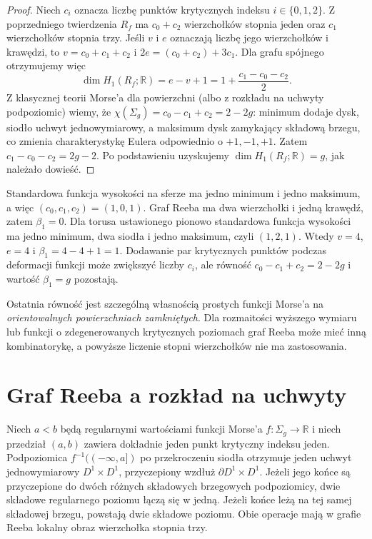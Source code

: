 \begin{proof}
Niech $c_i$ oznacza liczbę punktów krytycznych indeksu
$i\in\{0,1,2\}$. Z poprzedniego twierdzenia $R_f$ ma
$c_0+c_2$ wierzchołków stopnia jeden oraz $c_1$
wierzchołków stopnia trzy. Jeśli $v$ i $e$ oznaczają
liczbę jego wierzchołków i krawędzi, to
$v=c_0+c_1+c_2$ i
$2e=(c_0+c_2)+3c_1$.
Dla grafu spójnego otrzymujemy więc
\[
\dim H_1(R_f;\mathbb R)=e-v+1
=1+\frac{c_1-c_0-c_2}{2}.
\]
Z klasycznej teorii Morse'a dla powierzchni (albo
z rozkładu na uchwyty podpoziomic) wiemy, że
$\chi(\Sigma_g)=c_0-c_1+c_2=2-2g$:
minimum dodaje dysk, siodło uchwyt jednowymiarowy,
a maksimum dysk zamykający składową brzegu, co zmienia
charakterystykę Eulera odpowiednio o $+1,-1,+1$.
Zatem $c_1-c_0-c_2=2g-2$. Po podstawieniu uzyskujemy
$\dim H_1(R_f;\mathbb R)=g$, jak należało dowieść.
\end{proof}

\begin{przyklad}
Standardowa funkcja wysokości na sferze ma jedno minimum
i jedno maksimum, a więc $(c_0,c_1,c_2)=(1,0,1)$.
Graf Reeba ma dwa wierzchołki i jedną krawędź,
zatem $\beta_1=0$. Dla torusa ustawionego pionowo
standardowa funkcja wysokości ma jedno minimum,
dwa siodła i jedno maksimum, czyli $(1,2,1)$.
Wtedy $v=4$, $e=4$ i $\beta_1=4-4+1=1$.
Dodawanie par krytycznych punktów podczas deformacji
funkcji może zwiększyć liczby $c_i$, ale równość
$c_0-c_1+c_2=2-2g$ i wartość $\beta_1=g$ pozostają.
\end{przyklad}

\begin{uwaga}
Ostatnia równość jest szczególną własnością prostych
funkcji Morse'a na \emph{orientowalnych powierzchniach
zamkniętych}. Dla rozmaitości wyższego wymiaru
lub funkcji o zdegenerowanych krytycznych poziomach
graf Reeba może mieć inną kombinatorykę, a powyższe
liczenie stopni wierzchołków nie ma zastosowania.
\end{uwaga}

\section{Graf Reeba a rozkład na uchwyty}
\label{sec:tg-reeb-handles}

\begin{przyklad}
Niech $a<b$ będą regularnymi wartościami funkcji
Morse'a $f:\Sigma_g\to\mathbb R$ i niech przedział
$(a,b)$ zawiera dokładnie jeden punkt krytyczny indeksu
jeden. Podpoziomica $f^{-1}(( -\infty,a])$ po przekroczeniu
siodła otrzymuje jeden uchwyt jednowymiarowy
$D^1\times D^1$, przyczepiony wzdłuż
$\partial D^1\times D^1$. Jeżeli jego końce są przyczepione
do dwóch różnych składowych brzegowych podpoziomicy,
dwie składowe regularnego poziomu łączą się w jedną.
Jeżeli końce leżą na tej samej składowej brzegu,
powstają dwie składowe poziomu. Obie operacje mają
w grafie Reeba lokalny obraz wierzchołka stopnia trzy.
\end{przyklad}

